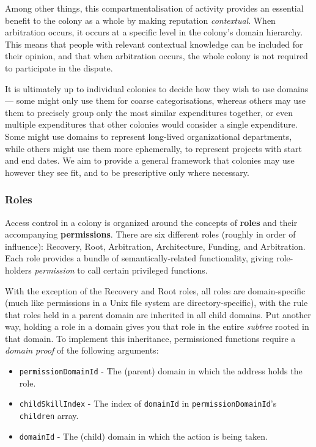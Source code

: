 Among other things, this compartmentalisation of activity provides an essential benefit to the colony as a whole by making reputation \textit{contextual}. When arbitration occurs, it occurs at a specific level in the colony's domain hierarchy. This means that people with relevant contextual knowledge can be included for their opinion, and that when arbitration occurs, the whole colony is not required to participate in the dispute.

It is ultimately up to individual colonies to decide how they wish to use domains --- some might only use them for coarse categorisations, whereas others may use them to precisely group only the most similar expenditures together, or even multiple expenditures that other colonies would consider a single expenditure. Some might use domains to represent long-lived organizational departments, while others might use them more ephemerally, to represent projects with start and end dates. We aim to provide a general framework that colonies may use however they see fit, and to be prescriptive only where necessary.

\subsubsection{Roles}

Access control in a colony is organized around the concepts of \textbf{roles} and their accompanying \textbf{permissions}. There are six different roles (roughly in order of influence): Recovery, Root, Arbitration, Architecture, Funding, and Arbitration. Each role provides a bundle of semantically-related functionality, giving role-holders \textit{permission} to call certain privileged functions.

With the exception of the Recovery and Root roles, all roles are domain-specific (much like permissions in a Unix file system are directory-specific), with the rule that roles held in a parent domain are inherited in all child domains. Put another way, holding a role in a domain gives you that role in the entire \textit{subtree} rooted in that domain. To implement this inheritance, permissioned functions require a \textit{domain proof} of the following arguments:

\begin{itemize}
\item \texttt{permissionDomainId} - The (parent) domain in which the address holds the role.
\item \texttt{childSkillIndex} - The index of \texttt{domainId} in \texttt{permissionDomainId}'s \texttt{children} array.
\item \texttt{domainId} - The (child) domain in which the action is being taken.
\end{itemize}

